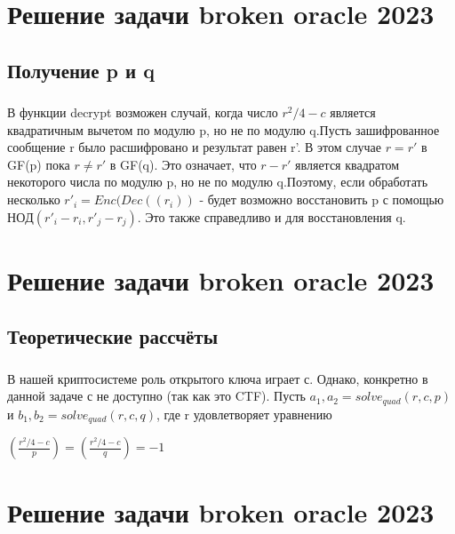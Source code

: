 \documentclass[t]{beamer}
\begin{document}
\section{Решение задачи broken oracle 2023}
\subsection{Получение p и q}
\begin{frame}
	\frametitle{\insertsection}
	\framesubtitle{\insertsubsection}
	   В функции decrypt возможен случай, когда число $r^2/4-c$ является квадратичным вычетом по модулю p, но не по модулю q.\newline Пусть зашифрованное сообщение r было расшифровано и результат равен r'. В этом случае $r=r'$ в GF(p) пока $r \neq r'$ в GF(q). Это означает, что $r-r'$ является квадратом некоторого числа по модулю p, но не по модулю q.\newline Поэтому, если обработать несколько $r'_i=Enc(Dec((r_i))$ - будет возможно восстановить p с помощью $НОД(r'_i-r_i,r'_j-r_j)$. Это также справедливо и для восстановления q. 
\end{frame}

\section{Решение задачи broken oracle 2023}
\subsection{Теоретические рассчёты}
\begin{frame}
	\frametitle{\insertsection}
	\framesubtitle{\insertsubsection}
    В нашей криптосистеме роль открытого ключа играет с. Однако, конкретно в данной задаче с не 
    доступно (так как это CTF). \newline
    Пусть $a_1,a_2=solve_{quad}(r,c,p)$ и $b_1,b_2=solve_{quad}(r,c,q)$, где r удовлетворяет уравнению \newline
    \begin{center}
    $\left( \frac{r^2/4-c}{p}\right)=\left( \frac{r^2/4-c}{q}\right)=-1$
    \end{center}
\end{frame}

\section{Решение задачи broken oracle 2023}
\end{document}
